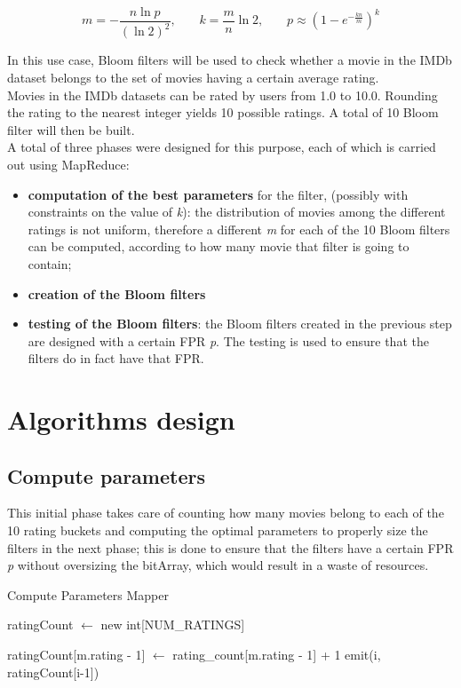 \begin{equation}\label{eq:parameters}
m = - \frac{n \ln p}{(\ln 2)^{2}} 
   \text{,}\quad\quad 
k = \frac{m}{n} \ln 2
\text{,}\quad\quad
p \approx (1-e^{-\frac{kn}{m}})^{k}
\end{equation}

\noindent In this use case, Bloom filters will be used to check whether a movie in the IMDb dataset belongs to the set of movies having a certain average rating.\\
Movies in the IMDb datasets can be rated by users from 1.0 to 10.0. Rounding the rating to the nearest integer yields 10 possible ratings.
A total of 10 Bloom filter will then be built.\\

\noindent A total of three phases were designed for this purpose, each of which is carried out using MapReduce:
\begin{itemize}
	\item \textbf{computation of the best parameters} for the filter, (possibly with constraints on the value of \textit{k}): the distribution of movies among the different ratings is not uniform, therefore a different \textit{m} for each of the 10 Bloom filters can be computed, according to how many movie that filter is going to contain;
	\item \textbf{creation of the Bloom filters}
	\item \textbf{testing of the Bloom filters}: the Bloom filters created in the previous step are designed with a certain FPR \textit{p}. The testing is used to ensure that the filters do in fact have that FPR.
\end{itemize}

\section{Algorithms design}

\subsection{Compute parameters}
This initial phase takes care of counting how many movies belong to each of the 10 rating buckets and computing the optimal parameters to properly size the filters in the next phase; this is done to ensure that the filters have a certain FPR \textit{p} without oversizing the bitArray, which would result in a waste of resources.

\begin{algorithm}[H]
	\caption{Compute Parameters Mapper} 
	\begin{algorithmic}[1]
			\State ratingCount $\gets$ new int[NUM\_RATINGS]
			
				\State ratingCount[m.rating - 1] $\gets$ rating\_count[m.rating - 1] + 1
			\EndFor
				\State emit(i, ratingCount[i-1])
			\EndFor
		\EndProcedure
	\end{algorithmic} 
\end{algorithm}

